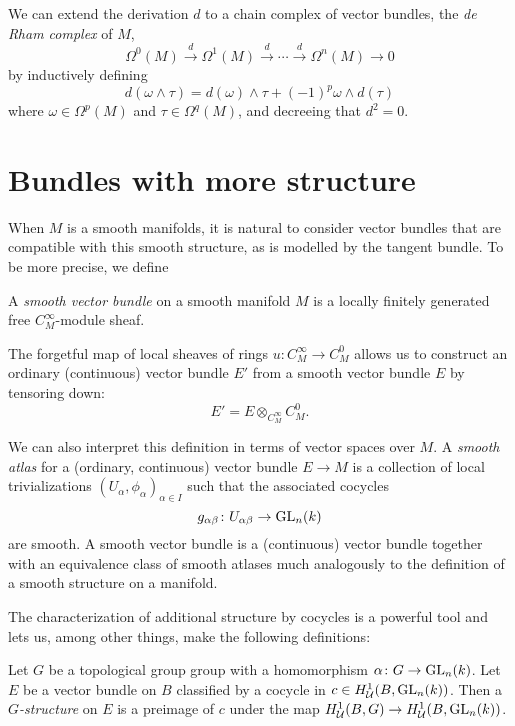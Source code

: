 \documentclass[a4paper,openany]{scrbook}
\begin{document}
We can extend the derivation $d$ to a chain complex of vector bundles, the \emph{de Rham complex} of $M$,
\[
\Omega^0(M) \xrightarrow{d} \Omega^1(M) \xrightarrow{d} \cdots \xrightarrow{d} \Omega^n(M) \to 0
\]
by inductively defining
\[
d(\omega \wedge \tau) = d(\omega) \wedge \tau + (-1)^{p} \omega \wedge d(\tau)
\]
where $\omega \in \Omega^p(M)$ and $\tau \in \Omega^q(M)$, and decreeing that $d^2=0$.



\section{Bundles with more structure}

When $M$ is a smooth manifolds, it is natural to consider vector bundles that are compatible with this smooth structure, as is modelled by the tangent bundle. To be more precise, we define

\begin{defn}
A \emph{smooth vector bundle} on a smooth manifold $M$ is a locally finitely generated free $C^\infty_M$-module sheaf.
\end{defn}

The forgetful map of local sheaves of rings $u\colon C^\infty_M \to C^0_M$ allows us to construct an ordinary (continuous) vector bundle $E'$ from a smooth vector bundle $E$ by tensoring down:
\[
E' = E \otimes_{C^\infty_M} C^0_M.
\]

We can also interpret this definition in terms of vector spaces over $M$. A \emph{smooth atlas} for a (ordinary, continuous) vector bundle $E \to M$ is a collection of local trivializations $(U_\alpha,\phi_\alpha)_{\alpha \in I}$ such that the associated cocycles
\[
g_{\alpha\beta}\colon U_{\alpha\beta} \to \operatorname{GL}_n(k)
\]
are smooth. A smooth vector bundle is a (continuous) vector bundle together with an equivalence class of smooth atlases much analogously to the definition of a smooth structure on a manifold.

The characterization of additional structure by cocycles is a powerful tool and lets us, among other things, make the following definitions:

\begin{defn}
Let $G$ be a topological group group with a homomorphism $\alpha\colon G \to \operatorname{GL}_n(k)$. Let $E$ be a vector bundle on $B$ classified by a cocycle in $c \in H^1_{\mathcal U}(B,\operatorname{GL}_n(k))$. Then a \emph{$G$-structure} on $E$ is a preimage of $c$ under the map $H^1_{\mathcal U}(B,G) \to H^1_{\mathcal U}(B,\operatorname{GL}_n(k))$.
\end{defn}
\end{document}
